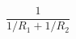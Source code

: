 \documentclass[12pt]{article}
\begin{document}
\sicpsize
\[
\frac{1}{1/R_1 + 1/R_2}
\]
\end{document}
